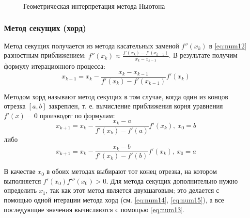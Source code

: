 \documentclass[a4paper,12pt]{report}
\begin{document}
\begin{figure}[ht]
\caption{Геометрическая интерпретация метода Ньютона}
\label{fig:newton_example}
\end{figure}

\subsubsection{Метод секущих (хорд)}
Метод секущих получается из метода касательных заменой $f''(x_{k})$ в \eqref{eq:num12} разностным приближением: $f''(x_{k}) \approx \frac{f'(x_{k})-f'(x_{k-1})}{x_{k}-x_{k-1}}$. В результате получим формулу итерационного процесса:
\begin{equation}
\label{eq:num13}
x_{k+1}=x_{k}-\frac{x_{k}-x_{k-1}}{f'(x_{k})-f'(x_{k-1})}f'(x_{k})
\end{equation}

Методом хорд называют метод секущих в том случае, когда один из концов отрезка $[a, b]$ закреплен, т. е. вычисление приближения корня уравнения $f'(x) = 0$ производят по формулам:
\begin{equation}
\label{eq:num14}
x_{k+1}=x_{k}-\frac{x_{k}-a}{f'(x_{k})-f'(a)}f'(x_{k}),\ x_{0} = b
\end{equation}
либо
\begin{equation}
\label{eq:num15}
x_{k+1}=x_{k}-\frac{x_{k}-b}{f'(x_{k})-f'(b)}f'(x_{k}),\ x_{0} = a
\end{equation}

В качестве $x_{0}$ в обоих методах выбирают тот конец отрезка, на котором выполняется $f'(x_{0})f'''(x_{0}) > 0$. Для метода секущих дополнительно нужно определить $x_{1}$, так как этот метод является двухшаговым; это делается с помощью одной итерации метода хорд (см. \eqref{eq:num14}, \eqref{eq:num15}), а все последующие значения вычисляются с помощью \eqref{eq:num13}.
\end{document}
